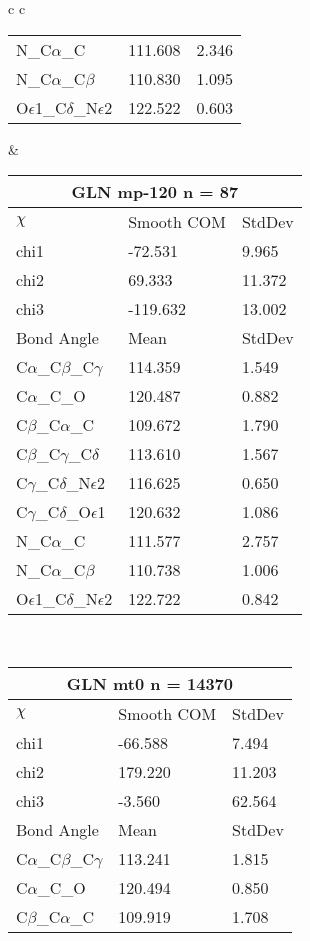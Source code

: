 \begin{longtable}{ c c }
\begin{tabular}{ l l l }
  N\_C$\alpha$\_C & 111.608 & 2.346\\
  N\_C$\alpha$\_C$\beta$ & 110.830 & 1.095\\
  O$\epsilon$1\_C$\delta$\_N$\epsilon$2 & 122.522 & 0.603\\
  \bottomrule
  \end{tabular}
  &
  \begin{tabular}{ l l l }
  \toprule
  \multicolumn{3}{c}{GLN \textbf{mp-120} n = 87} \\ \toprule
  $\chi$       & Smooth COM & StdDev \\ \midrule
  chi1 & -72.531 & 9.965 \\ 
  chi2 & 69.333 & 11.372 \\ 
  chi3 & -119.632 & 13.002 \\ \midrule
  Bond Angle   & Mean     & StdDev \\ \midrule
  C$\alpha$\_C$\beta$\_C$\gamma$ & 114.359 & 1.549\\
  C$\alpha$\_C\_O & 120.487 & 0.882\\
  C$\beta$\_C$\alpha$\_C & 109.672 & 1.790\\
  C$\beta$\_C$\gamma$\_C$\delta$ & 113.610 & 1.567\\
  C$\gamma$\_C$\delta$\_N$\epsilon$2 & 116.625 & 0.650\\
  C$\gamma$\_C$\delta$\_O$\epsilon$1 & 120.632 & 1.086\\
  N\_C$\alpha$\_C & 111.577 & 2.757\\
  N\_C$\alpha$\_C$\beta$ & 110.738 & 1.006\\
  O$\epsilon$1\_C$\delta$\_N$\epsilon$2 & 122.722 & 0.842\\
  \bottomrule
  \end{tabular}
  \\
  \begin{tabular}{ l l l }
  \toprule
  \multicolumn{3}{c}{GLN \textbf{mt0} n = 14370} \\ \toprule
  $\chi$       & Smooth COM & StdDev \\ \midrule
  chi1 & -66.588 & 7.494 \\ 
  chi2 & 179.220 & 11.203 \\ 
  chi3 & -3.560 & 62.564 \\ \midrule
  Bond Angle   & Mean     & StdDev \\ \midrule
  C$\alpha$\_C$\beta$\_C$\gamma$ & 113.241 & 1.815\\
  C$\alpha$\_C\_O & 120.494 & 0.850\\
  C$\beta$\_C$\alpha$\_C & 109.919 & 1.708\\

\end{tabular}
\end{longtable}
